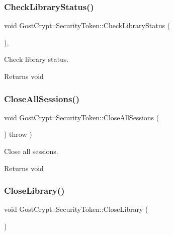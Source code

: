 \subsubsection{\texorpdfstring{Check\+Library\+Status()}{CheckLibraryStatus()}}
{\footnotesize\ttfamily void Gost\+Crypt\+::\+Security\+Token\+::\+Check\+Library\+Status (\begin{DoxyParamCaption}{ }\end{DoxyParamCaption})\hspace{0.3cm}{\ttfamily [static]}, {\ttfamily [protected]}}



Check library status. 

\begin{DoxyReturn}{Returns}
void 
\end{DoxyReturn}
\mbox{\label{class_gost_crypt_1_1_security_token_af12b0d8a2113b5bf9fc542089c22251e}} 
\subsubsection{\texorpdfstring{Close\+All\+Sessions()}{CloseAllSessions()}}
{\footnotesize\ttfamily void Gost\+Crypt\+::\+Security\+Token\+::\+Close\+All\+Sessions (\begin{DoxyParamCaption}{ }\end{DoxyParamCaption}) throw  ) \hspace{0.3cm}{\ttfamily [static]}}



Close all sessions. 

\begin{DoxyReturn}{Returns}
void 
\end{DoxyReturn}
\mbox{\label{class_gost_crypt_1_1_security_token_a70bb91f6128eef7fff77cf8cd32b456d}} 
\subsubsection{\texorpdfstring{Close\+Library()}{CloseLibrary()}}
{\footnotesize\ttfamily void Gost\+Crypt\+::\+Security\+Token\+::\+Close\+Library (\begin{DoxyParamCaption}{ }\end{DoxyParamCaption})\hspace{0.3cm}{\ttfamily [static]}}



